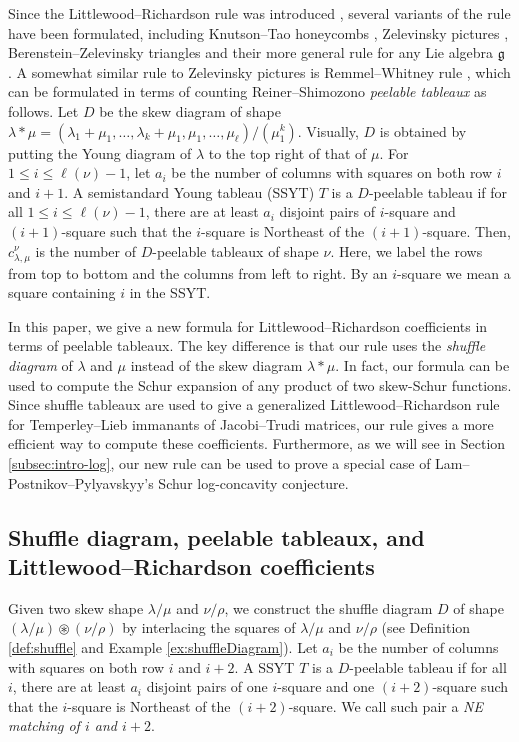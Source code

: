\documentclass[ALCO,Unicode]{cedram}
\begin{document}
    Since the Littlewood--Richardson rule was introduced \cite{littlewood1934group}, several variants of the rule have been formulated, including Knutson--Tao honeycombs \cite{knutson1999honeycomb}, Zelevinsky pictures \cite{zelevinsky1981generalization}, Berenstein--Zelevinsky triangles \cite{berenstein1992triple} and their more general rule for any Lie algebra $\mathfrak{g}$ \cite{berenstein1999tensor}. A somewhat similar rule to Zelevinsky pictures is Remmel--Whitney rule \cite{remmel1984multiplying}, which can be formulated in terms of counting Reiner--Shimozono \textit{peelable tableaux} \cite{reiner1998percentage} as follows. Let $D$ be the skew diagram of shape $\lambda\ast\mu = (\lambda_1+\mu_1,\ldots,\lambda_k +\mu_1,\mu_1,\ldots,\mu_\ell)/(\mu_1^k)$. Visually, $D$ is obtained by putting the Young diagram of $\lambda$ to the top right of that of $\mu$. For $1\leq i\leq \ell(\nu)-1$, let $a_i$ be the number of columns with squares on both row $i$ and $i+1$. A semistandard Young tableau (SSYT) $T$ is a $D$-peelable tableau if for all $1\leq i\leq \ell(\nu)-1$, there are at least $a_i$ disjoint pairs of $i$-square and $(i+1)$-square such that the $i$-square is Northeast of the $(i+1)$-square. Then, $c_{\lambda,\mu}^{\nu}$ is the number of $D$-peelable tableaux of shape $\nu$. Here, we label the rows from top to bottom and the columns from left to right. By an $i$-square we mean a square containing $i$ in the SSYT.
    
    In this paper, we give a new formula for Littlewood--Richardson coefficients in terms of peelable tableaux. The key difference is that our rule uses the \textit{shuffle diagram} of $\lambda$ and $\mu$ instead of the skew diagram $\lambda * \mu$. In fact, our formula can be used to compute the Schur expansion of any product of two skew-Schur functions. Since shuffle tableaux are used to give a generalized Littlewood--Richardson rule for Temperley--Lieb immanants of Jacobi--Trudi matrices, our rule gives a more efficient way to compute these coefficients. Furthermore, as we will see in Section \ref{subsec:intro-log}, our new rule can be used to prove a special case of Lam--Postnikov--Pylyavskyy's Schur log-concavity conjecture.

\subsection{Shuffle diagram, peelable tableaux, and Littlewood--Richardson coefficients}

    \begin{defi}\label{def:peelable}
        Given two skew shape $\lambda/\mu$ and $\nu/\rho$, we construct the shuffle diagram $D$ of shape $(\lambda/\mu)\circledast(\nu/\rho)$ by interlacing the squares of $\lambda/\mu$ and $\nu/\rho$ (see Definition \ref{def:shuffle} and Example \ref{ex:shuffleDiagram}). Let $a_i$ be the number of columns with squares on both row $i$ and $i+2$. A SSYT $T$ is a $D$-peelable tableau if for all $i$, there are at least $a_i$ disjoint pairs of one $i$-square and one $(i+2)$-square such that the $i$-square is Northeast of the $(i+2)$-square. We call such pair a \textit{NE matching of $i$ and $i+2$}.
    \end{defi}
\end{document}
